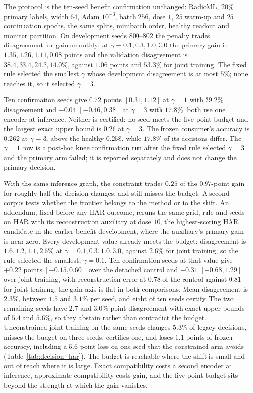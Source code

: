 \documentclass{article}
\begin{document}
The protocol is the ten-seed benefit confirmation unchanged: RadioML, $20\%$
primary labels, width $64$, Adam $10^{-3}$, batch $256$, dose $1$, $25$ warm-up
and $25$ continuation epochs, the same splits, minibatch order, healthy readout
and monitor partition. On development seeds $800$--$802$ the penalty trades
disagreement for gain smoothly: at $\gamma=0.1,0.3,1.0,3.0$ the primary gain is
$1.35,1.26,1.11,0.08$ points and the validation disagreement is
$38.4,33.4,24.3,14.0\%$, against $1.06$ points and $53.3\%$ for joint training.
The fixed rule selected the smallest $\gamma$ whose development disagreement is
at most $5\%$; none reaches it, so it selected $\gamma=3$.

Ten confirmation seeds give $0.72$ points $[0.31,1.12]$ at $\gamma=1$ with
$29.2\%$ disagreement and $-0.04$ $[-0.46,0.38]$ at $\gamma=3$ with $17.8\%$;
both use one encoder at inference. Neither is certified: no seed meets the
five-point budget and the largest exact upper bound is $0.26$ at $\gamma=3$. The
frozen consumer's accuracy is $0.262$ at $\gamma=3$, above the healthy $0.258$,
while $17.8\%$ of its decisions differ. The $\gamma=1$ row is a post-hoc knee
confirmation run after the fixed rule selected $\gamma=3$ and the primary arm
failed; it is reported separately and does not change the primary decision.

With the same inference graph, the constraint trades $0.25$ of the $0.97$-point gain for
roughly half the decision changes, and still misses the budget. A second corpus
tests whether the frontier belongs to the method or to the shift. An addendum,
fixed before any HAR outcome, reruns the same
grid, rule and seeds on HAR with its reconstruction auxiliary at dose $10$, the
highest-scoring HAR candidate in the earlier benefit development, where the
auxiliary's primary gain is near zero. Every development value already meets the
budget: disagreement is $1.6,1.2,1.1,2.5\%$ at $\gamma=0.1,0.3,1.0,3.0$, against
$2.6\%$ for joint training, so the rule selected the smallest, $\gamma=0.1$. Ten
confirmation seeds at that value give $+0.22$ points $[-0.15,0.60]$ over the
detached control and $+0.31$ $[-0.68,1.29]$ over joint training, with
reconstruction error at $0.78$ of the control against $0.81$ for joint training;
the gain axis is flat in both comparisons. Mean disagreement is $2.3\%$, between
$1.5$ and $3.1\%$ per seed, and eight of ten seeds certify. The two remaining
seeds have $2.7$ and $3.0\%$ point disagreement with exact upper bounds of $5.4$
and $5.6\%$, so they abstain rather than contradict the budget. Unconstrained
joint training on the same seeds changes $5.3\%$ of legacy decisions, misses the
budget on three seeds, certifies one, and loses $1.1$ points of frozen accuracy,
including a $5.6$-point loss on one seed that the constrained arm avoids
(Table~\ref{tab:decision_har}). The budget is reachable where the shift is small
and out of reach where it is large. Exact compatibility costs a second encoder at
inference, approximate compatibility costs gain, and the five-point budget sits
beyond the strength at which the gain vanishes.
\end{document}
